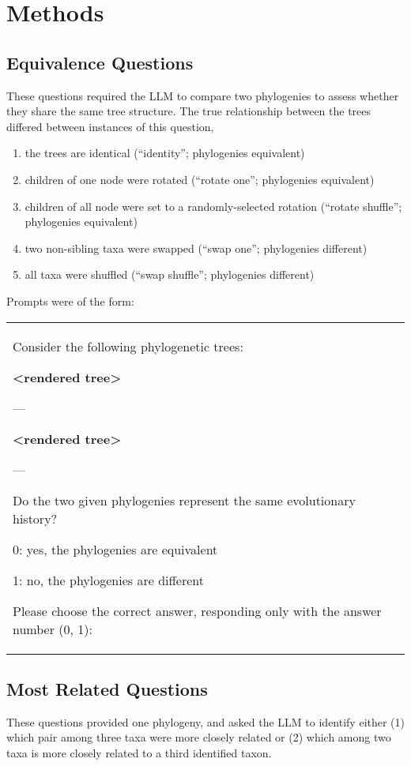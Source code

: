 \section{Methods} \label{sec:methods}

\subsection{Equivalence Questions}

These questions required the LLM to compare two phylogenies to assess whether they share the same tree structure.
The true relationship between the trees differed between instances of this question,
\begin{enumerate}
\item the trees are identical (``identity''; phylogenies equivalent)
\item children of one node were rotated (``rotate one''; phylogenies equivalent)
\item children of all node were set to a randomly-selected rotation (``rotate shuffle''; phylogenies equivalent)
\item two non-sibling taxa were swapped (``swap one''; phylogenies different)
\item all taxa were shuffled (``swap shuffle''; phylogenies different)
\end{enumerate}

Prompts were of the form:

\begin{tabular}{|p{}}
Consider the following phylogenetic trees:

\textbf{<rendered tree>}

---

\textbf{<rendered tree>}

---

Do the two given phylogenies represent the same evolutionary history?


0: yes, the phylogenies are equivalent

1: no, the phylogenies are different

Please choose the correct answer, responding only with the answer number (0, 1):
\end{tabular}

\subsection{Most Related Questions}

These questions provided one phylogeny, and asked the LLM to identify either (1) which pair among three taxa were more closely related or (2) which among two taxa is more closely related to a third identified taxon.

